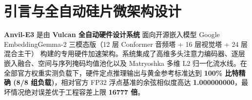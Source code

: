 \documentclass[11pt,a4paper]{article}
\begin{document}
\section{引言与全自动硅片微架构设计}

\textbf{Anvil-E3} 是由 \textbf{Vulcan 全自动硬件设计系统} 面向开源嵌入模型 Google EmbeddingGemma-2 三模态版（12 层 Conformer 音频塔 +\allowbreak{} 16 层视觉塔 +\allowbreak{} 24 层混合主干） 构建的专用硬件加速架构。系统集成了高维多头注意力编码器、逐层嵌入融合、空间与序列掩码均值池化以及 Matryoshka 多维 L2 归一化流水线。在全部官方权重实测负载下，硬件定点推理输出与黄金参考标准达到 \textbf{100\% 比特精确 (\allowbreak{}8/\allowbreak{}8 组负载)\allowbreak{}}，相对官方 FP32 浮点基准的余弦相似度高达 \textbf{1.000000000}，最坏情况绝对误差优于工程容差上限 \textbf{16777 倍}。

\vspace{2pt}
\end{document}
